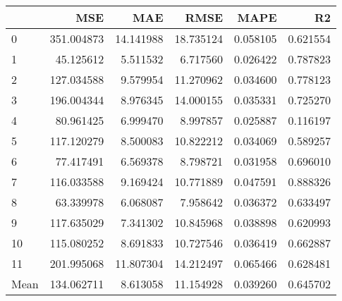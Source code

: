 \begin{tabular}{lrrrrr}
\toprule
 & MSE & MAE & RMSE & MAPE & R2 \\
\midrule
0 & 351.004873 & 14.141988 & 18.735124 & 0.058105 & 0.621554 \\
1 & 45.125612 & 5.511532 & 6.717560 & 0.026422 & 0.787823 \\
2 & 127.034588 & 9.579954 & 11.270962 & 0.034600 & 0.778123 \\
3 & 196.004344 & 8.976345 & 14.000155 & 0.035331 & 0.725270 \\
4 & 80.961425 & 6.999470 & 8.997857 & 0.025887 & 0.116197 \\
5 & 117.120279 & 8.500083 & 10.822212 & 0.034069 & 0.589257 \\
6 & 77.417491 & 6.569378 & 8.798721 & 0.031958 & 0.696010 \\
7 & 116.033588 & 9.169424 & 10.771889 & 0.047591 & 0.888326 \\
8 & 63.339978 & 6.068087 & 7.958642 & 0.036372 & 0.633497 \\
9 & 117.635029 & 7.341302 & 10.845968 & 0.038898 & 0.620993 \\
10 & 115.080252 & 8.691833 & 10.727546 & 0.036419 & 0.662887 \\
11 & 201.995068 & 11.807304 & 14.212497 & 0.065466 & 0.628481 \\
Mean & 134.062711 & 8.613058 & 11.154928 & 0.039260 & 0.645702 \\
\bottomrule
\end{tabular}
